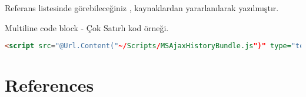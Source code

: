 \documentclass[10pt,a4paper]{article}
\begin{document}
Referans listesinde görebileceğiniz \cite{Haack2011},\cite{Haley2010} kaynaklardan
yararlanılarak yazılmıştır.




Multiline code block - Çok Satırlı kod örneği.












\begin{lstlisting}[label=code-ExampleOfInlineExpression,caption=Example of Inline Expression,language=html]
<script src="@Url.Content("~/Scripts/MSAjaxHistoryBundle.js")" type="text/javascript"></script>
\end{lstlisting}






\section*{References}





% 

\end{document}
